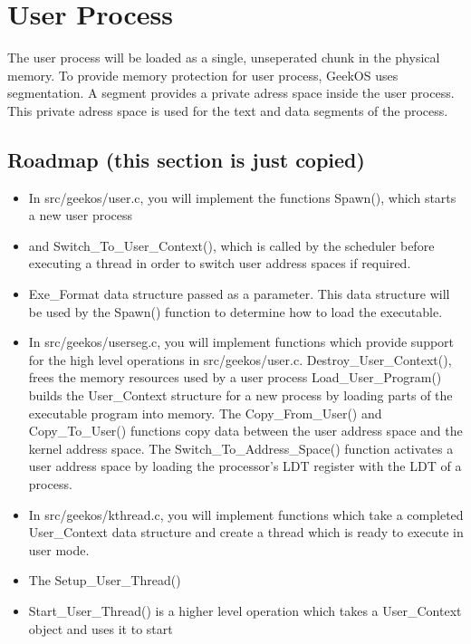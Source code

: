 
%


\section{User Process}


The user process will be loaded as a single, unseperated chunk in the physical memory.
To provide memory protection for user process, GeekOS uses segmentation.
A segment provides a private adress space inside the user process. This private adress space is used for the text and data segments of the process.



\subsection{Roadmap (this section is just copied)}
\begin{itemize}
  \item In src/geekos/user.c, you will implement the functions Spawn(), which starts a new user process
  \item and Switch\_To\_User\_Context(), 
		which is called by the scheduler before executing a thread in order to switch user address spaces if required.
  \item Exe\_Format data structure passed as a parameter. 
  		This data structure will be used by the Spawn() function to determine how to load the executable.
  \item In src/geekos/userseg.c, 
   		you will implement functions which provide support for the high level operations in src/geekos/user.c.
   		\subitem Destroy\_User\_Context(), frees the memory resources used by a user process
   		\subitem Load\_User\_Program() builds the User\_Context structure for a new process by loading parts of the executable program into memory.
   		\subitem The Copy\_From_User() and Copy\_To\_User() functions copy data between the user address space and the kernel address space. 
   		\subitem The Switch\_To\_Address\_Space() function activates a user address space by loading the processor's LDT register with the LDT of a process.
   \item In src/geekos/kthread.c, you will implement functions which take a completed User\_Context data structure and create a thread which is ready to execute in user mode. 
   \item The Setup_User_Thread()
   \item Start\_User_Thread() is a higher level operation which takes a User\_Context object and uses it to start
\end{itemize}

























%